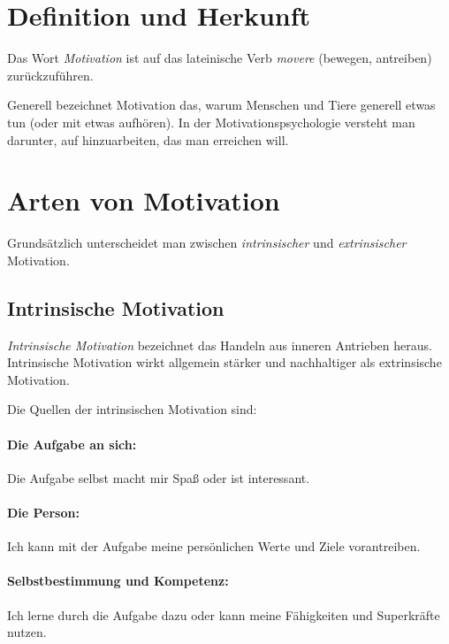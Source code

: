 \section{Definition und Herkunft}

Das Wort \emph{Motivation} ist auf das lateinische Verb \emph{movere} (bewegen, antreiben) zurückzuführen.~\cite{duden-herkunft}

Generell bezeichnet Motivation das, warum Menschen und Tiere generell etwas tun (oder mit etwas aufhören). In der Motivationspsychologie versteht man darunter, auf hinzuarbeiten, das man erreichen will. \cite{rheinberg-motivation}

\section{Arten von Motivation}

Grundsätzlich unterscheidet man zwischen \emph{intrinsischer} und \emph{extrinsischer} Motivation.~\cite{self-determiniation-theory, pelz-motivation}


\subsection{Intrinsische Motivation}
\label{intrinsische-motivation}

\emph{Intrinsische Motivation} bezeichnet das Handeln aus inneren Antrieben heraus. Intrinsische Motivation wirkt allgemein stärker und nachhaltiger als extrinsische Motivation.

Die Quellen der intrinsischen Motivation sind:

\paragraph{Die Aufgabe an sich:} Die Aufgabe selbst macht mir Spaß oder ist interessant.

\paragraph{Die Person:} Ich kann mit der Aufgabe meine persönlichen Werte und Ziele vorantreiben.

\paragraph{Selbstbestimmung und Kompetenz:} Ich lerne durch die Aufgabe dazu oder kann meine Fähigkeiten und Superkräfte nutzen.

